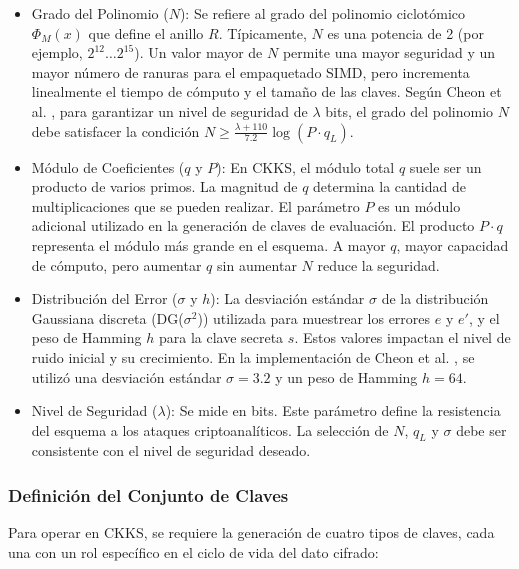 \begin{itemize}
   \item Grado del Polinomio ($N$): Se refiere al grado del polinomio ciclotómico $\Phi_M(x)$ que define el anillo $R$. Típicamente, $N$ es una potencia de 2 (por ejemplo, $2^{12} \dots 2^{15}$). Un valor mayor de $N$ permite una mayor seguridad y un mayor número de ranuras para el empaquetado SIMD, pero incrementa linealmente el tiempo de cómputo y el tamaño de las claves. Según Cheon et al. \cite{CKKS17}, para garantizar un nivel de seguridad de $\lambda$ bits, el grado del polinomio $N$ debe satisfacer la condición $N \ge \frac{\lambda + 110}{7.2}\log(P \cdot q_L)$.
   
   \item Módulo de Coeficientes ($q$ y $P$): En CKKS, el módulo total $q$ suele ser un producto de varios primos. La magnitud de $q$ determina la cantidad de multiplicaciones que se pueden realizar. El parámetro $P$ es un módulo adicional utilizado en la generación de claves de evaluación. El producto $P \cdot q$ representa el módulo más grande en el esquema. A mayor $q$, mayor capacidad de cómputo, pero aumentar $q$ sin aumentar $N$ reduce la seguridad.
   
   \item Distribución del Error ($\sigma$ y $h$): La desviación estándar $\sigma$ de la distribución Gaussiana discreta (DG($\sigma^2$)) utilizada para muestrear los errores $e$ y $e'$, y el peso de Hamming $h$ para la clave secreta $s$. Estos valores impactan el nivel de ruido inicial y su crecimiento. En la implementación de Cheon et al. \cite{CKKS17}, se utilizó una desviación estándar $\sigma = 3.2$ y un peso de Hamming $h = 64$.
   
   \item Nivel de Seguridad ($\lambda$): Se mide en bits. Este parámetro define la resistencia del esquema a los ataques criptoanalíticos. La selección de $N$, $q_L$ y $\sigma$ debe ser consistente con el nivel de seguridad deseado.

\end{itemize}

\subsubsection{Definición del Conjunto de Claves}

Para operar en CKKS, se requiere la generación de cuatro tipos de claves, cada una con un rol específico en el ciclo de vida del dato cifrado:

